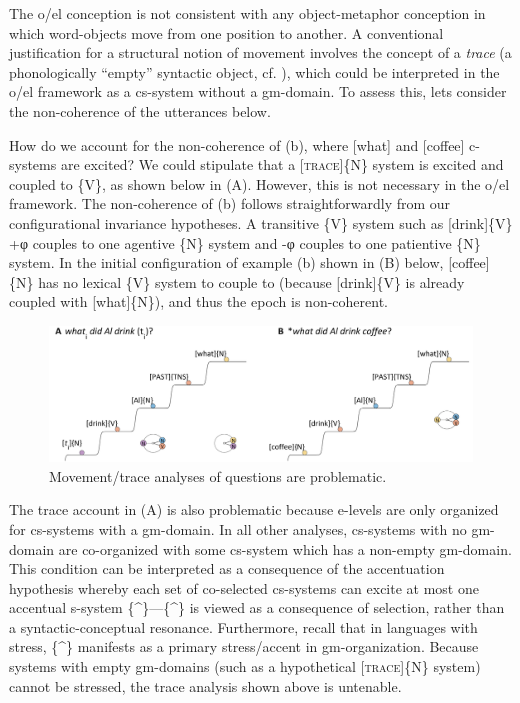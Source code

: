    The o/el conception is not consistent with any object-metaphor conception in which word-objects move from one position to another. A conventional justification for a structural notion of movement involves the concept of a \textit{trace} (a phonologically “empty” syntactic object, cf. \citealt{Chomsky1965}), which could be interpreted in the o/el framework as a cs-system without a gm-domain. To assess this, lets consider the non-coherence of the utterances below.

\ea
\z
\z

  How do we account for the non-coherence of (b), where [what] and [coffee] c-systems are excited?  We could stipulate that a [\textsc{trace}]\{N\} system is excited and coupled to \{V\}, as shown below in (A). However, this is not necessary in the o/el framework. The non-coherence of (b) follows straightforwardly from our configurational invariance hypotheses. A transitive \{V\} system such as [drink]\{V\} +φ couples to one agentive \{N\} system and -φ couples to one patientive \{N\} system. In the initial configuration of example (b) shown in (B) below, [coffee]\{N\} has no lexical \{V\} system to couple to (because [drink]\{V\} is already coupled with [what]\{N\}), and thus the epoch is non-coherent.

  
\begin{figure}
\includegraphics[width=\textwidth]{figures/Tilsen-img161.png}
\caption{Movement/trace analyses of questions are problematic.}
\label{fig:7:17}
\end{figure}
 

  The trace account in (A) is also problematic because e-levels are only organized for cs-systems with a gm-domain. In all other analyses, cs-systems with no gm-domain are co-organized with some cs-system which has a non-empty gm-domain. This condition can be interpreted as a consequence of the accentuation hypothesis whereby each set of co-selected cs-systems can excite at most one accentual s-system \{\^{}\}—\{\^{}\} is viewed as a consequence of selection, rather than a syntactic-conceptual resonance. Furthermore, recall that in languages with stress, \{\^{}\} manifests as a primary stress/accent in gm-organization. Because systems with empty gm-domains (such as a hypothetical [\textsc{trace}]\{N\} system) cannot be stressed, the trace analysis shown above is untenable.

